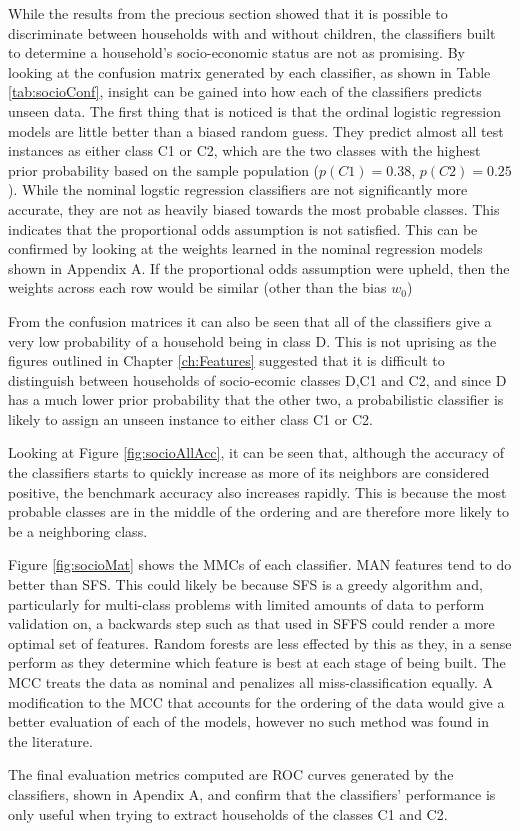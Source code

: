 While the results from the precious section showed that it is possible to discriminate between households with and without children, the classifiers built to determine a household's socio-economic status are not as promising.  By looking at the confusion matrix generated by each classifier, as shown in Table \ref{tab:socioConf}, insight can be gained into how each of the classifiers predicts unseen data. The first thing that is noticed is that the ordinal logistic regression models are little better than a biased random guess. They predict almost all test instances as either class C1 or C2, which are the two classes with the highest prior probability based on the sample population ($p(C1)=0.38$, $p(C2)=0.25$). While the nominal logstic regression classifiers are not significantly more accurate, they are not as heavily biased towards the most probable classes. This indicates that the proportional odds assumption is not satisfied. This can be confirmed by looking at the weights learned in the nominal regression models shown in Appendix A. If the proportional odds assumption were upheld, then the weights across each row would be similar (other than the bias $w_0$)
\socioConf

From the confusion matrices it can also be seen that all of the classifiers give a very low probability of a household being in class D. This is not uprising as the figures outlined in Chapter \ref{ch:Features} suggested that it is difficult to  distinguish between households of socio-ecomic classes D,C1 and C2, and since D has a much lower prior probability that the other two, a probabilistic classifier is likely to assign an unseen instance to either class C1 or C2.

Looking at Figure \ref{fig:socioAllAcc}, it can be seen that, although the accuracy of the classifiers starts to quickly increase as more of its neighbors are considered positive, the benchmark accuracy also increases rapidly. This is because the most probable classes are in the middle of the ordering and are therefore more likely to be a neighboring class.


\socioAllAcc

\socioMat

Figure \ref{fig:socioMat} shows the MMCs of each classifier. MAN features tend to do better than SFS. This could likely be because SFS is a greedy algorithm and, particularly for multi-class problems with limited amounts of data to perform validation on,  a backwards step such as that used in SFFS could render a more optimal set of features. Random forests are less effected by this as they, in a sense perform as they determine which feature is best at each stage of being built. The MCC treats the data as nominal and penalizes all miss-classification equally. A modification to the MCC that accounts for the ordering of the data would give a better evaluation of each of the models, however no such method was found in the literature.  

The final evaluation metrics computed are ROC curves generated by the classifiers, shown in Apendix A, and confirm that the classifiers' performance is only useful when trying to extract households of the classes C1 and C2.


